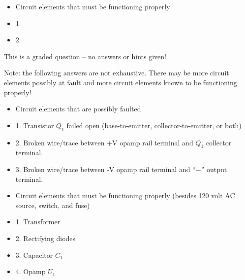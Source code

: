 \begin{itemize}
\goodbreak
\item{} Circuit elements that must be functioning properly
\item{1.} 
\item{2.} 
\end{itemize}

\vfil 

\eject






This is a graded question -- no answers or hints given!







Note: the following answers are not exhaustive.  There may be more circuit elements possibly at fault and more circuit elements known to be functioning properly!

\begin{itemize}
\item{} Circuit elements that are possibly faulted
\item{1.} Transistor $Q_1$ failed open (base-to-emitter, collector-to-emitter, or both)
\item{2.} Broken wire/trace between +V opamp rail terminal and $Q_1$ collector terminal.
\item{3.} Broken wire/trace between -V opamp rail terminal and ``$-$'' output terminal.
\end{itemize}

\begin{itemize}
\item{} Circuit elements that must be functioning properly (besides 120 volt AC source, switch, and fuse)
\item{1.} Transformer
\item{2.} Rectifying diodes
\item{3.} Capacitor $C_1$
\item{4.} Opamp $U_1$
\end{itemize}





